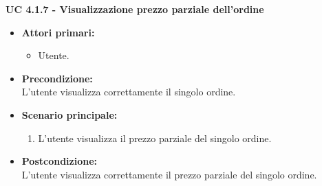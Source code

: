 \vspace{0.4cm}

\noindent \textbf{\large UC 4.1.7 - Visualizzazione prezzo parziale dell'ordine}
\label{uc:visualizzazione-prezzo-parziale-ord}
\begin{itemize}

	\item \textbf{Attori primari: }
		\begin{itemize}
			\item Utente.
		\end{itemize}

	\item \textbf{Precondizione: }\\[0.3cm]
		L'utente visualizza correttamente il singolo ordine.

	\item \textbf{Scenario principale: }
		\begin{enumerate}
			\item L'utente visualizza il prezzo parziale del singolo ordine.
		\end{enumerate}
		

	\item \textbf{Postcondizione: }\\[0.3cm]
		L'utente visualizza correttamente il prezzo parziale del singolo ordine.

\end{itemize}

\vspace{0.4cm}


